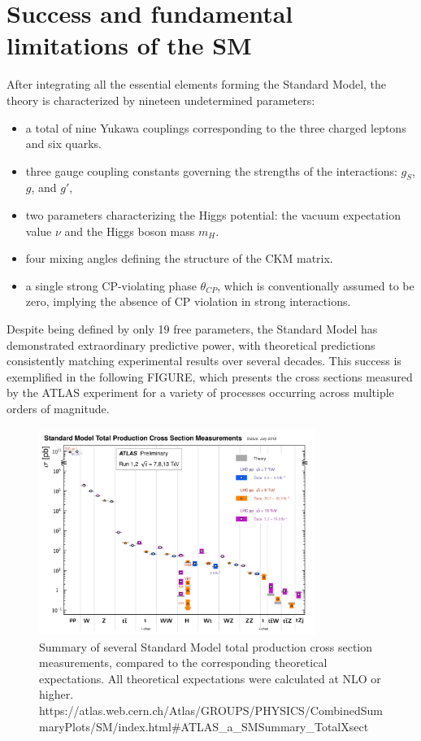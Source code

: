 \documentclass[11pt,twoside]{book}
\begin{document}
\section{Success and fundamental limitations of the \acrshort{SM}}
\label{sec:b\acrshort{SM}}
After integrating all the essential elements forming the Standard Model, the theory is characterized by nineteen undetermined parameters:
\begin{itemize}
  \item a total of nine Yukawa couplings corresponding to the three charged leptons and six quarks.
  \item three gauge coupling constants governing the strengths of the interactions: \( g_S \), \( g \), and \( g' \),
  \item two parameters characterizing the Higgs potential: the vacuum expectation value \(\nu\) and the Higgs boson mass \(m_H\).
  \item four mixing angles defining the structure of the CKM matrix.
  \item a single strong CP-violating phase \(\theta_{CP}\), which is conventionally assumed to be zero, implying the absence of CP violation in strong interactions.
\end{itemize}
Despite being defined by only 19 free parameters, the Standard Model has demonstrated extraordinary predictive power, with theoretical predictions consistently matching experimental results over several decades. This success is exemplified in the following FIGURE, which presents the cross sections measured by the ATLAS experiment for a variety of processes occurring across multiple orders of magnitude.
\begin{figure}[htbp]
  \centering
  \includegraphics[width=0.8\textwidth]{images/totalxsect.pdf}
  \caption{Summary of several Standard Model total production cross section measurements, compared to the corresponding theoretical expectations. All theoretical expectations were calculated at NLO or higher. https://atlas.web.cern.ch/Atlas/GROUPS/PHYSICS/CombinedSummaryPlots/\acrshort{SM}/index.html#ATLAS_a_\acrshort{SM}Summary_TotalXsect}
  \label{fig:totalxsect}
\end{figure}
\end{document}
